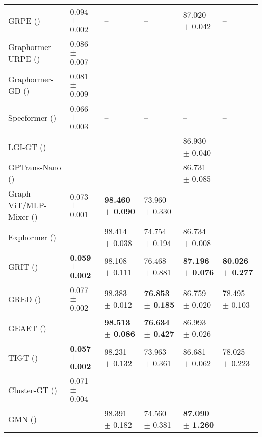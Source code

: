 \begin{table*}[t]
{\begin{tabular}{l|lllll}
        GRPE (\citeyear{park2022grpe}) & 0.094{\tiny{ $\pm$ 0.002}} & – & – & 87.020{\tiny{ $\pm$ 0.042}} & – \\
        Graphormer-URPE (\citeyear{luo2022your}) & 0.086{\tiny{ $\pm$ 0.007}} & – & – & – & – \\
        Graphormer-GD (\citeyear{zhang2023rethinking}) & 0.081{\tiny{ $\pm$ 0.009}} & – & – & – & – \\
        Specformer (\citeyear{bo2023specformer}) & 0.066{\tiny{ $\pm$ 0.003}} & – & – & – & – \\
        LGI-GT (\citeyear{yinlgi}) & – & – & – & 86.930{\tiny{ $\pm$ 0.040}} & – \\
        GPTrans-Nano (\citeyear{chen2023graph}) & – & – & – & 86.731{\tiny{ $\pm$ 0.085}} & – \\
        Graph ViT/MLP-Mixer (\citeyear{he2023generalization}) & 0.073{\tiny{ $\pm$ 0.001}} & \textbf{\textcolor{darkorange!90}{98.460{\tiny{ $\pm$ 0.090}}}} & 73.960{\tiny{ $\pm$ 0.330}} & – & – \\
        Exphormer (\citeyear{shirzad2023exphormer}) & – & 98.414{\tiny{ $\pm$ 0.038}} & 74.754{\tiny{ $\pm$ 0.194}} & 86.734{\tiny{ $\pm$ 0.008}} & – \\
        GRIT (\citeyear{ma2023graph}) & \textbf{\textcolor{tealblue!90}{0.059{\tiny{ $\pm$ 0.002}}}} & 98.108{\tiny{ $\pm$ 0.111}} & 76.468{\tiny{ $\pm$ 0.881}} & \textbf{\textcolor{customcyan}{87.196{\tiny{ $\pm$ 0.076}}}} & \textbf{\textcolor{customcyan}{80.026{\tiny{ $\pm$ 0.277}}}} \\
        GRED (\citeyear{ding2024recurrent}) & 0.077{\tiny{ $\pm$ 0.002}} & 98.383{\tiny{ $\pm$ 0.012}} & \textbf{\textcolor{tealblue!90}{76.853{\tiny{ $\pm$ 0.185}}}} & 86.759{\tiny{ $\pm$ 0.020}} & 78.495{\tiny{ $\pm$ 0.103}} \\
        GEAET (\citeyear{liang2024graph}) & – & \textbf{\textcolor{tealblue!90}{98.513{\tiny{ $\pm$ 0.086}}}} & \textbf{\textcolor{darkorange!90}{76.634{\tiny{ $\pm$ 0.427}}}} & 86.993{\tiny{ $\pm$ 0.026}} & – \\
        TIGT (\citeyear{choi2024topology}) & \textbf{\textcolor{customcyan}{0.057{\tiny{ $\pm$ 0.002}}}} & 98.231{\tiny{ $\pm$ 0.132}} & 73.963{\tiny{ $\pm$ 0.361}} & 86.681{\tiny{ $\pm$ 0.062}} & 78.025{\tiny{ $\pm$ 0.223}} \\
        Cluster-GT (\citeyear{huang2024clusterwise}) & 0.071{\tiny{ $\pm$ 0.004}} & – & – & – & – \\
        GMN (\citeyear{behrouz2024graph}) & – & 98.391{\tiny{ $\pm$ 0.182}} & 74.560{\tiny{ $\pm$ 0.381}} & \textbf{\textcolor{tealblue!90}{87.090{\tiny{ $\pm$ 1.260}}}} & – \\

\end{tabular}}
\end{table*}
